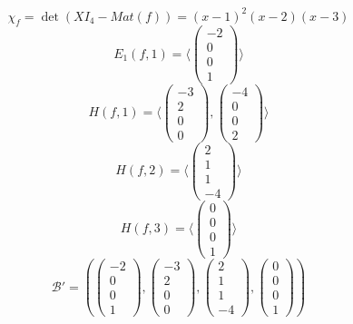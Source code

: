 \documentclass[10pt,a4paper]{article}
\begin{document}
\begin{equation}
\chi_{f} = \det(XI_{4} - Mat(f)) = (x - 1)^{2}(x - 2)(x - 3)
\end{equation}
\begin{equation}
E_{1}(f, 1) = \langle
\begin{pmatrix}
-2\\0\\0\\1
\end{pmatrix}
\rangle
\end{equation}
\begin{equation}
H(f, 1) = \langle
\begin{pmatrix}
-3\\2\\0\\0
\end{pmatrix},
\begin{pmatrix}
-4\\0\\0\\2
\end{pmatrix}
\rangle
\end{equation}
\begin{equation}
H(f, 2) = \langle
\begin{pmatrix}
2\\1\\1\\-4
\end{pmatrix}
\rangle
\end{equation}
\begin{equation}
H(f, 3) = \langle
\begin{pmatrix}
0\\0\\0\\1
\end{pmatrix}
\rangle
\end{equation}
\begin{equation}
\mathcal{B}' = \left(
\begin{pmatrix}
-2\\0\\0\\1
\end{pmatrix},
\begin{pmatrix}
-3\\2\\0\\0
\end{pmatrix},
\begin{pmatrix}
2\\1\\1\\-4
\end{pmatrix},
\begin{pmatrix}
0\\0\\0\\1
\end{pmatrix}
\right)
\end{equation}
\end{document}
